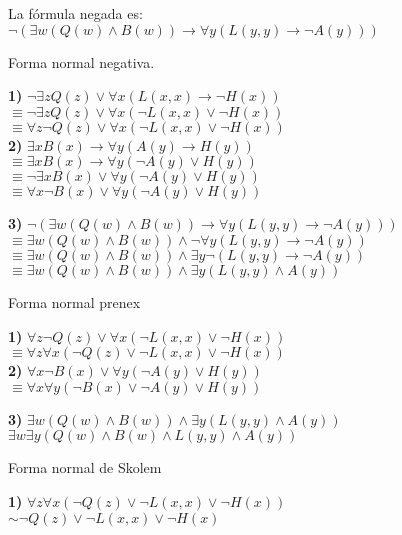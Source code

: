 \documentclass{article}
\begin{document}
La fórmula negada es: $\lnot (\exists w (Q(w) \land B(w)) \rightarrow \forall y (L(y,y) \rightarrow \lnot A(y)))$

Forma normal negativa.

\textbf{1)} $\lnot \exists z Q(z) \lor \forall x (L(x,x) \rightarrow \lnot H(x))$\\
$\equiv \lnot \exists z Q(z) \lor \forall x (\lnot L(x,x) \lor \lnot H(x))$\\
$\equiv \forall z \lnot Q(z) \lor \forall x (\lnot L(x,x) \lor \lnot H(x))$\\

\textbf{2)} $\exists x B(x) \rightarrow \forall y (A(y) \rightarrow H(y))$\\
$\equiv \exists x B(x) \rightarrow \forall y (\lnot A(y) \lor H(y))$\\
$\equiv \lnot \exists x B(x) \lor \forall y (\lnot A(y) \lor H(y))$\\
$\equiv \forall x \lnot B(x) \lor \forall y (\lnot A(y) \lor H(y))$

\textbf{3)} $\lnot (\exists w (Q(w) \land B(w)) \rightarrow \forall y (L(y,y) \rightarrow \lnot A(y)))$\\
$\equiv \exists w (Q(w) \land B(w)) \land \lnot \forall y (L(y,y) \rightarrow \lnot A(y))$\\
$\equiv \exists w (Q(w) \land B(w)) \land \exists y \lnot (L(y,y) \rightarrow \lnot A(y))$\\
$\equiv \exists w (Q(w) \land B(w)) \land \exists y (L(y,y) \land A(y))$

Forma normal prenex

\textbf{1)} $\forall z \lnot Q(z) \lor \forall x (\lnot L(x,x) \lor \lnot H(x))$\\
$\equiv \forall z \forall x (\lnot Q(z) \lor \lnot L(x,x) \lor \lnot H(x))$\\

\textbf{2)} $\forall x \lnot B(x) \lor \forall y (\lnot A(y) \lor H(y))$\\
$\equiv \forall x \forall y (\lnot B(x) \lor \lnot A(y) \lor H(y))$

\textbf{3)} $\exists w (Q(w) \land B(w)) \land \exists y (L(y,y) \land A(y))$\\
$\exists w \exists y (Q(w) \land B(w) \land L(y,y) \land A(y))$

Forma normal de Skolem

\textbf{1)} $\forall z \forall x (\lnot Q(z) \lor \lnot L(x,x) \lor \lnot H(x))$\\
$\sim \lnot Q(z) \lor \lnot L(x,x) \lor \lnot H(x)$
\end{document}
